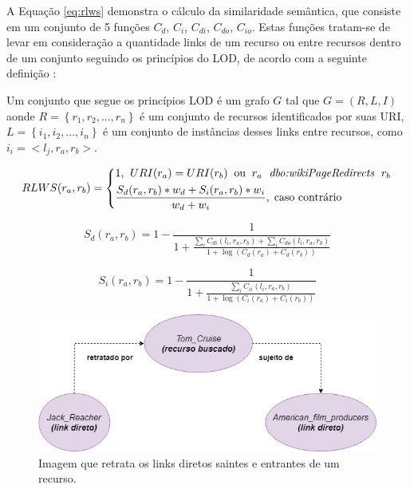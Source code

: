 A Equação \ref{eq:rlws} demonstra o cálculo da similaridade semântica, que consiste em um conjunto de 5 funções  $C_d$, $C_i$, $C_{di}$, $C_{do}$, $C_{io}$. Estas funções tratam-se de levar em consideração a quantidade links de um recurso ou entre recursos dentro de um conjunto seguindo os princípios do \ac{LOD}, de acordo com a seguinte definição \citep{PiaoResim}:

\begin{definition}
Um conjunto que segue os princípios LOD é um grafo $G$ tal que $G = (R, L, I)$ aonde $R = \left\{r_1, r_2, ..., r_n\right\}$ é um conjunto de recursos identificados por suas URI, $L = \left\{i_1, i_2, ..., i_n\right\}$ é um conjunto de instâncias desses links entre recursos, como $i_i = <l_j, r_a, r_b>$.
\end{definition}

\begin{equation}
	RLWS(r_a, r_b) = 
	\begin{dcases*}
		1 \text{,} \;\; URI(r_a) = URI(r_b) \;\; \text{ou} \;\; r_a \; \textit{ dbo:wikiPageRedirects } \; r_b\\
		\frac{S_d(r_a, r_b) * w_d + S_i(r_a, r_b) * w_i}{w_d + w_i}, \; \text{caso contrário}
	\end{dcases*}
\label{eq:rlws}
\end{equation}

\begin{equation}
	S_d(r_a, r_b) = 1 - \frac{1}{1 + \frac{\sum_i C_{di}(l_i, r_a, r_b) + \sum_i C_{do}(l_i, r_a, r_b)}{1 + \log (C_d(r_a) + C_d(r_b))}}
\label{eq:rlws_ex1}
\end{equation}

\begin{equation}
	S_i(r_a, r_b) = 1 - \frac{1}{1 + \frac{\sum_i C_{ii}(l_i, r_a, r_b)}{1 + \log (C_i(r_a) + C_i(r_b))}}
\label{eq:rlws_ex2}
\end{equation}

\begin{figure}
	\centering
	\includegraphics[scale=0.5]{imagens/cd_links.png}
	\caption{Imagem que retrata os links diretos saintes e entrantes de um recurso.}
	\label{fig:cd_links}
\end{figure}

